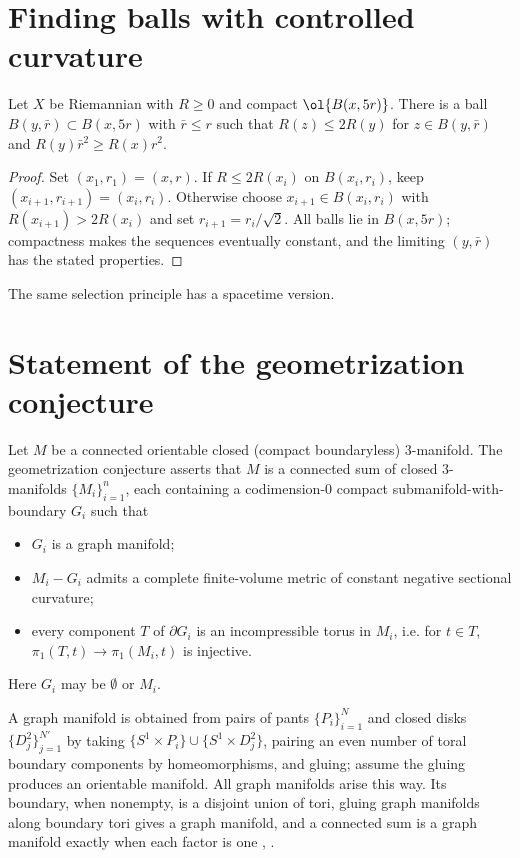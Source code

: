 \section{Finding balls with controlled curvature} \label{pointpicking}

\begin{lemma}
  \label{lem:kl-finding-balls-controlled-curvature-existence-curvature}
\label{selection}

Let $X$ be Riemannian with $R\geq0$ and compact
$\ol{B(x,5r)}$. There is a ball $B(y,\bar r)\subset B(x,5r)$ with
$\bar r\leq r$ such that $R(z)\leq2R(y)$ for $z\in B(y,\bar r)$ and
$R(y)\bar r^2\geq R(x)r^2$.
\end{lemma}
\begin{proof}
\sketch
Set $(x_1,r_1)=(x,r)$. If $R\leq2R(x_i)$ on $B(x_i,r_i)$, keep
$(x_{i+1},r_{i+1})=(x_i,r_i)$. Otherwise choose
$x_{i+1}\in B(x_i,r_i)$ with $R(x_{i+1})>2R(x_i)$ and set
$r_{i+1}=r_i/\sqrt2$. All balls lie in $B(x,5r)$; compactness makes the
sequences eventually constant, and the limiting $(y,\bar r)$ has the stated
properties.
\end{proof}

The same selection principle has a spacetime version.

\section{Statement of the geometrization conjecture} \label{geom}

Let $M$ be a connected orientable closed (compact boundaryless) $3$-manifold.
The geometrization conjecture asserts that $M$ is a connected sum of closed
$3$-manifolds $\{M_i\}_{i=1}^n$, each containing a codimension-$0$ compact
submanifold-with-boundary $G_i$ such that
\begin{itemize}
\item $G_i$ is a graph manifold;
\item $M_i-G_i$ admits a complete finite-volume metric of constant negative
sectional curvature;
\item every component $T$ of $\partial G_i$ is an incompressible torus in
$M_i$, i.e. for $t\in T$, $\pi_1(T,t)\rightarrow\pi_1(M_i,t)$ is injective.
\end{itemize}
Here $G_i$ may be $\emptyset$ or $M_i$.

A graph manifold is obtained from pairs of pants $\{P_i\}_{i=1}^N$ and
closed disks $\{D_j^2\}_{j=1}^{N'}$ by taking
$\{S^1\times P_i\}\cup\{S^1\times D_j^2\}$, pairing an even number of
toral boundary components by homeomorphisms, and gluing; assume the gluing
produces an orientable manifold. All graph manifolds arise this way. Its
boundary, when nonempty, is a disjoint union of tori, gluing graph manifolds
along boundary tori gives a graph manifold, and a connected sum is a graph
manifold exactly when each factor is one \cite[Chapter 2.4]{Matveev},
\cite[Proposition 2.4.3]{Matveev}.

